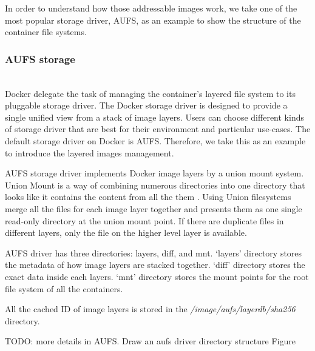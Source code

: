 
In order to understand how those addressable images work, we take one of the most popular storage driver, AUFS, as an example to show the structure of the container file systems.



\subsubsection{AUFS storage}~\\
Docker delegate the task of managing the container's layered file system to its pluggable storage driver. 
The Docker storage driver is designed to provide a single unified view from a stack of image layers.
Users can choose different kinds of storage driver that are best for their environment and particular use-cases. The default storage driver on Docker is AUFS. Therefore, we take this as an example to introduce the layered images management.

AUFS storage driver implements Docker image layers by a union mount system. Union Mount is a way of combining numerous directories into one directory that looks like it contains the content from all the them \cite{unionMount}. Using Union filesystems merge all the files for each image layer together and presents them as one single read-only directory at the union mount point. If there are duplicate files in different layers, only the file on the higher level layer is available.

AUFS driver has three directories: layers, diff, and mnt. `layers' directory stores the metadata of how image layers are stacked together. `diff' directory stores the exact data inside each layers. `mnt' directory stores the mount points for the root file system of all the containers. 

All the cached ID of image layers is stored in the \textit{/image/aufs/layerdb/sha256} directory.

TODO: more details in AUFS. Draw an aufs driver directory structure Figure

